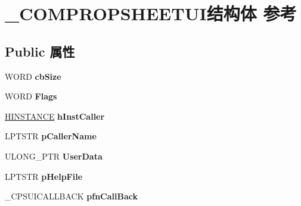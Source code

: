 \hypertarget{struct___c_o_m_p_r_o_p_s_h_e_e_t_u_i}{}\section{\+\_\+\+C\+O\+M\+P\+R\+O\+P\+S\+H\+E\+E\+T\+U\+I结构体 参考}
\label{struct___c_o_m_p_r_o_p_s_h_e_e_t_u_i}
\subsection*{Public 属性}
\begin{DoxyCompactItemize}
\item 
\mbox{\label{struct___c_o_m_p_r_o_p_s_h_e_e_t_u_i_a1b03e20fbb8a7b837104a82c6e4d25da}} 
W\+O\+RD {\bfseries cb\+Size}
\item 
\mbox{\label{struct___c_o_m_p_r_o_p_s_h_e_e_t_u_i_a79c0e20b8afc9541a57b93ef9a7d7f26}} 
W\+O\+RD {\bfseries Flags}
\item 
\mbox{\label{struct___c_o_m_p_r_o_p_s_h_e_e_t_u_i_a7377f458f2edca059448eaabff501cd3}} 
\hyperlink{interfacevoid}{H\+I\+N\+S\+T\+A\+N\+CE} {\bfseries h\+Inst\+Caller}
\item 
\mbox{\label{struct___c_o_m_p_r_o_p_s_h_e_e_t_u_i_a19f922b036b23cabf106e5272cd63c3c}} 
L\+P\+T\+S\+TR {\bfseries p\+Caller\+Name}
\item 
\mbox{\label{struct___c_o_m_p_r_o_p_s_h_e_e_t_u_i_a11bc7254da217fc1ea720a1218d4f319}} 
U\+L\+O\+N\+G\+\_\+\+P\+TR {\bfseries User\+Data}
\item 
\mbox{\label{struct___c_o_m_p_r_o_p_s_h_e_e_t_u_i_afb92c406fbbedca244f2a46857074f0e}} 
L\+P\+T\+S\+TR {\bfseries p\+Help\+File}
\item 
\mbox{\label{struct___c_o_m_p_r_o_p_s_h_e_e_t_u_i_a3f0d65b18e463b55ef390c8a7bf8219c}} 
\+\_\+\+C\+P\+S\+U\+I\+C\+A\+L\+L\+B\+A\+CK {\bfseries pfn\+Call\+Back}
\item 
\mbox{\label{struct___c_o_m_p_r_o_p_s_h_e_e_t_u_i_a4b6cf6d986b0bced4ad165e64f7d2357}} 

\end{DoxyCompactItemize}
